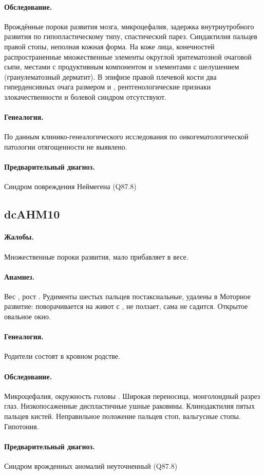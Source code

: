 \documentclass[a4paper,14pt]{extarticle}
\newcommand{\gramm}{г}
\newcommand{\cm}{см}
\newcommand{\months}{мес.}
\begin{document}
\paragraph{Обследование.}
Врождённые пороки развития мозга, микроцефалия, задержка внутриутробного развития по гипопластическому типу, спастический парез.
Синдактилия  пальцев правой стопы, неполная кожная форма.
На коже лица, конечностей распространенные множественные элементы округлой эритематозной очаговой сыпи, местами с продуктивным компонентом и элементами с шелушением (гранулематозный дерматит).
В эпифизе правой плечевой кости два гиперденсивных очага размером \numprint[\cm]{0.5} и \numprint[\cm]{0.2}, рентгенологические признаки злокачественности и болевой синдром отсутствуют.

\paragraph{Генеалогия.}
По данным клинико-генеалогического исследования по онкогематологической патологии отягощенности не выявлено. 

\paragraph{Предварительный диагноз.}
Синдром повреждения Неймегена (Q87.8)

\subsection*{dcAHM10}

\paragraph{Жалобы.}
Множественные пороки развития, мало прибавляет в весе.

\paragraph{Анамнез.}
Вес \numprint[\gramm]{3410}, рост \numprint[\cm]{53}.
Рудименты шестых пальцев постаксиальные, удалены в \numprint[\months]{6}
Моторное развитие: поворачивается на живот с \numprint[\months]{6}, не ползает, сама не садится.
Открытое овальное окно. 
 
\paragraph{Генеалогия.}
Родители состоят в кровном родстве. 

\paragraph{Обследование.}
Микроцефалия, окружность головы \numprint[\cm]{42}.
Широкая переносица, монголоидный разрез глаз.
Низкопосаженные диспластичные ушные раковины.
Клинодактилия пятых пальцев кистей.
Неправильное положение пальцев стоп, вальгусные стопы.
Гипотония.

\paragraph{Предварительный диагноз.}
Синдром врожденных аномалий неуточненный (Q87.8)
\end{document}
